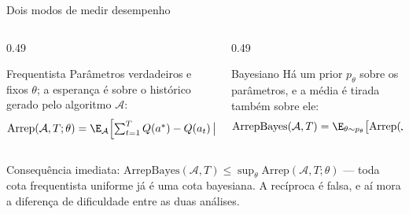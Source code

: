 \documentclass[aspectratio=169, 11pt]{beamer}
\newcommand{\arrep}{\mathrm{Arrep}}
\newcommand{\arrepb}{\mathrm{ArrepBayes}}
\newcommand{\alg}{\mathcal{A}}
\begin{document}
\begin{frame}{Dois modos de medir desempenho}
  \begin{columns}[T]
    \begin{column}{0.49\textwidth}
      \begin{defbox}{Frequentista}
        Parâmetros verdadeiros e fixos $\theta$; a esperança é sobre o
        histórico gerado pelo algoritmo $\alg$:
        {\footnotesize\[
          \arrep(\alg, T; \theta) = \E_{\alg}\!\left[\textstyle\sum_{t=1}^{T}
            Q(a^{*}) - Q(a_t)\,\big|\,\theta\right]
        \]}
        \vspace{-1.3em}
      \end{defbox}
    \end{column}
    \begin{column}{0.49\textwidth}
      \begin{defbox}{Bayesiano}
        Há um prior $p_\theta$ sobre os parâmetros, e a média é tirada
        também sobre ele:
        {\footnotesize\[
          \arrepb(\alg, T) = \E_{\theta \sim p_\theta}\big[
            \arrep(\alg, T; \theta)\big]
        \]}
        \vspace{-1.3em}
      \end{defbox}
    \end{column}
  \end{columns}

  \medskip

  \begin{ideiabox}
    Consequência imediata:
    $\arrepb(\alg,T) \le \sup_{\theta} \arrep(\alg, T; \theta)$ —
    \alert{toda cota frequentista uniforme já é uma cota bayesiana}. A
    recíproca é falsa, e aí mora a diferença de dificuldade entre as duas
    análises.
  \end{ideiabox}
\end{frame}
\end{document}
